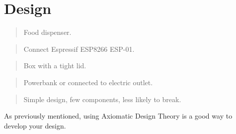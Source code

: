 \documentclass[twocolumn]{webofc}
\begin{document}
\section{Design}


\begin{quote} \textbf{} Food dispenser.
\end{quote}

\begin{quote} \textbf{} Connect Espressif ESP8266 ESP-01.
\end{quote}
\begin{quote} \textbf{} Box with a tight lid.
\end{quote}
\begin{quote} \textbf{} Powerbank or connected to electric outlet.
\end{quote}
\begin{quote} \textbf{} Simple design, few components, less likely to break.
\end{quote}




As previously mentioned, using Axiomatic Design Theory is a good way to develop your design.
\end{document}
